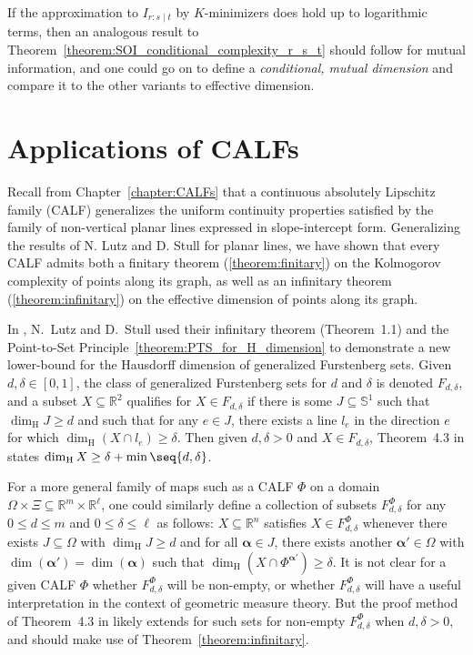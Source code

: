 If the approximation to $I_{r : s \mid t}$ by $K$-minimizers does hold up to logarithmic terms, then an analogous result to Theorem~\ref{theorem:SOI_conditional_complexity_r_s_t} should follow for mutual information, and one could go on to define a \textit{conditional, mutual dimension} and compare it to the other variants to effective dimension.

\section{Applications of CALFs}

Recall from Chapter~\ref{chapter:CALFs} that a continuous absolutely Lipschitz family (CALF) generalizes the uniform continuity properties satisfied by the family of non-vertical planar lines expressed in slope-intercept form. Generalizing the results of N. Lutz and D. Stull for planar lines, we have shown that every CALF admits both a finitary theorem (\ref{theorem:finitary}) on the Kolmogorov complexity of points along its graph, as well as an infinitary theorem (\ref{theorem:infinitary}) on the effective dimension of points along its graph. 

In \cite{LS16}, N.~Lutz and D.~Stull used their infinitary theorem (Theorem~1.1) and the Point-to-Set Principle~\ref{theorem:PTS_for_H_dimension} to demonstrate a new lower-bound for the Hausdorff dimension of generalized Furstenberg sets. Given $d, \delta \in [0, 1]$, the class of generalized Furstenberg sets for $d$ and $\delta$ is denoted $F_{d, \delta}$, and a subset $X \subseteq \mathbb{R}^2$ qualifies for $X \in F_{d, \delta}$ if there is some $J \subseteq \mathbb{S}^1$ such that $\dim_{\operatorname{H}} J \geq d$ and such that for any $e \in J$, there exists a line $l_e$ in the direction $e$ for which $\dim_{\operatorname{H}}(X \cap l_e) \geq \delta$. Then given $d, \delta > 0$ and $X \in F_{d, \delta}$, Theorem~4.3 in \cite{LS16} states $\dim_{\operatorname{H}} X \geq \delta + \min \seq{d, \delta}$.

For a more general family of maps such as a CALF $\Phi$ on a domain $\Omega \times \Xi \subseteq \mathbb{R}^m \times \mathbb{R}^\ell$, one could similarly define a collection of subsets $F^\Phi_{d, \delta}$ for any $0 \leq d \leq m$ and $0 \leq \delta \leq \ell$ as follows: $X \subseteq \mathbb{R}^n$ satisfies $X \in F^\Phi_{d, \delta}$ whenever there exists $J \subseteq \Omega$ with $\dim_{\operatorname{H}}J \geq d$ and for all $\boldsymbol{\alpha} \in J$, there exists another $\boldsymbol{\alpha}' \in \Omega$ with $\dim(\boldsymbol{\alpha}') = \dim(\boldsymbol{\alpha})$ such that $\dim_{\operatorname{H}}(X \cap \Phi^{\boldsymbol{\alpha}'}) \geq \delta$. It is not clear for a given CALF $\Phi$ whether $F^\Phi_{d, \delta}$ will be non-empty, or whether $F^\Phi_{d, \delta}$ will have a useful interpretation in the context of geometric measure theory. But the proof method of Theorem~4.3 in \cite{LS16} likely extends for such sets for non-empty $F^\Phi_{d, \delta}$ when $d, \delta > 0$, and should make use of Theorem~\ref{theorem:infinitary}.

